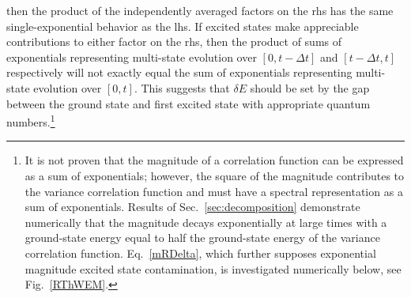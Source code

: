   then the product of the independently averaged factors on the rhs has the
  same single-exponential behavior as the lhs.
  If excited states make appreciable contributions to either factor on the rhs, then the product of sums of exponentials representing multi-state evolution over $[0,t-\Delta t]$ and $[t-\Delta t, t]$ respectively will not exactly equal the sum of exponentials representing multi-state evolution over $[0,t]$.
  This suggests that $\delta E$ should be set by the gap between the ground state and first excited state with appropriate quantum numbers.\footnote{  It is not proven that the magnitude of a correlation function can be expressed as a sum of exponentials; however,
  the square of the magnitude contributes to the variance correlation function and must have a spectral representation as a sum of exponentials.
  Results of Sec.~\ref{sec:decomposition} demonstrate numerically that the magnitude decays exponentially at large times with a ground-state energy equal to half the ground-state energy of the variance correlation function.
  Eq.~\ref{mRDelta}, which further supposes exponential magnitude excited state contamination, is investigated numerically below, see Fig.~\ref{RThWEM}.}

